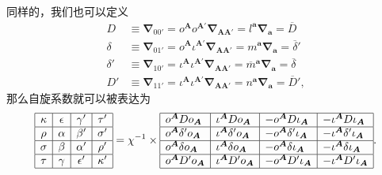 同样的，我们也可以定义
\begin{equation*}
	\begin{aligned}
		D & \equiv \boldsymbol{\nabla }_{00'} =o^{\boldsymbol{A}} o^{\boldsymbol{A} '}\boldsymbol{\nabla }_{\boldsymbol{AA} '} =l^{\boldsymbol{a}}\boldsymbol{\nabla }_{\boldsymbol{a}} =\overline{D}\\
		\delta  & \equiv \boldsymbol{\nabla }_{01'} =o^{\boldsymbol{A}} \iota ^{\boldsymbol{A} '}\boldsymbol{\nabla }_{\boldsymbol{AA} '} =m^{\boldsymbol{a}}\boldsymbol{\nabla }_{\boldsymbol{a}} =\overline{\delta } '\\
		\delta ' & \equiv \boldsymbol{\nabla }_{10'} =\iota ^{\boldsymbol{A}} \iota ^{\boldsymbol{A} '}\boldsymbol{\nabla }_{\boldsymbol{AA} '} =\overline{m}^{\boldsymbol{a}}\boldsymbol{\nabla }_{\boldsymbol{a}} =\overline{\delta }\\
		D' & \equiv \boldsymbol{\nabla }_{11'} =\iota ^{\boldsymbol{A}} \iota ^{\boldsymbol{A} '}\boldsymbol{\nabla }_{\boldsymbol{AA} '} =n^{\boldsymbol{a}}\boldsymbol{\nabla }_{\boldsymbol{a}} =\overline{D} ',
	\end{aligned}
\end{equation*}
那么自旋系数就可以被表达为
\begin{equation}
	\begin{array}{|c|c|c|c|}
		\hline
		\kappa  & \epsilon  & \gamma ' & \tau '\\
		\hline
		\rho  & \alpha  & \beta ' & \sigma '\\
		\hline
		\sigma  & \beta  & \alpha ' & \rho '\\
		\hline
		\tau  & \gamma  & \epsilon ' & \kappa '\\
		\hline
	\end{array} =\chi ^{-1} \times \begin{array}{|l|l|l|l|}
		\hline
		o^{\boldsymbol{A}} Do_{\boldsymbol{A}} & \iota ^{\boldsymbol{A}} Do_{\boldsymbol{A}} & -o^{\boldsymbol{A}} D\iota _{\boldsymbol{A}} & -\iota ^{\boldsymbol{A}} D\iota _{\boldsymbol{A}}\\
		\hline
		o^{\boldsymbol{A}} \delta 'o_{\boldsymbol{A}} & \iota ^{\boldsymbol{A}} \delta 'o_{\boldsymbol{A}} & -o^{\boldsymbol{A}} \delta '\iota _{\boldsymbol{A}} & -\iota ^{\boldsymbol{A}} \delta '\iota _{\boldsymbol{A}}\\
		\hline
		o^{\boldsymbol{A}} \delta o_{\boldsymbol{A}} & \iota ^{\boldsymbol{A}} \delta o_{\boldsymbol{A}} & -o^{\boldsymbol{A}} \delta \iota _{\boldsymbol{A}} & -\iota ^{\boldsymbol{A}} \delta \iota _{\boldsymbol{A}}\\
		\hline
		o^{\boldsymbol{A}} D'o_{\boldsymbol{A}} & \iota ^{\boldsymbol{A}} D'o_{\boldsymbol{A}} & -o^{\boldsymbol{A}} D'\iota _{\boldsymbol{A}} & -\iota ^{\boldsymbol{A}} D'\iota _{\boldsymbol{A}}\\
		\hline
	\end{array} .
	\label{eq:5.46}
\end{equation}


